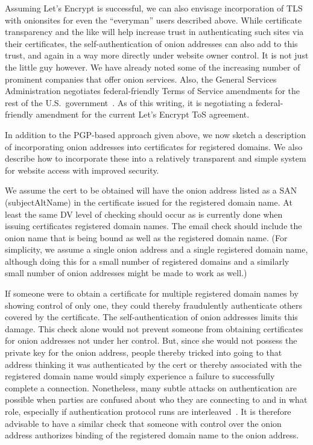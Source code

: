 \documentclass[10pt, conference, compsocconf]{styles/IEEEtran}
\begin{document}
Assuming Let's Encrypt is successful, we can also envisage
incorporation of TLS with onionsites for even the ``everyman'' users
described above.  While certificate transparency and the like will help
increase trust in authenticating such sites via their certificates,
the self-authentication of onion addresses can also add to this trust,
and again in a way more directly under website owner control.  It is
not just the little guy however. We have already noted some of the
increasing number of prominent companies that offer onion
services. Also, the General Services Administration negotiates
federal-friendly Terms of Service amendments for the rest of the U.S.\
government~\cite{gsa-tos}. As of this writing, it is negotiating a
federal-friendly amendment for the current Let's Encrypt ToS
agreement.

In addition to the PGP-based approach given above,
we now sketch a description of incorporating onion addresses into
certificates for registered domains. We also describe how to
incorporate these into a relatively transparent and simple system for
website access with improved security. 


We assume the cert to be obtained will have the onion address listed
as a SAN (subjectAltName) in the certificate issued for the registered
domain name.  At least the same DV level of checking should occur as
is currently done when issuing certificates registered domain
names. The email check should include the onion name that is being
bound as well as the registered domain name.  (For simplicity, we
assume a single onion address and a single registered domain name,
although doing this for a small number of registered domains and a
similarly small number of onion addresses might be made to work as
well.)


If someone were to obtain a certificate for multiple registered domain
names by showing control of only one, they could thereby fraudulently
authenticate others covered by the certificate. The
self-authentication of onion addresses limits this damage.  This check
alone would not prevent someone from obtaining certificates for onion
addresses not under her control. But, since she would not possess the
private key for the onion address, people thereby tricked into going
to that address thinking it was authenticated by the cert or thereby
associated with the registered domain name would simply experience a
failure to successfully complete a connection. Nonetheless, many
subtle attacks on authentication are possible when parties are
confused about who they are connecting to and in what role, especially
if authentication protocol runs are interleaved~\cite{fosad00}.  It is
therefore advisable to have a similar check that someone with control
over the onion address authorizes binding of the registered domain
name to the onion address.
\end{document}
